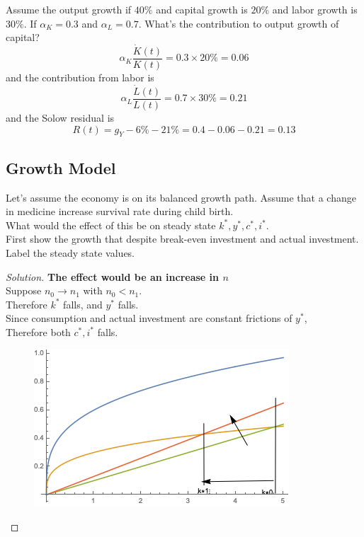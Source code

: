 \documentclass[]{article}
\begin{document}
	    \begin{example}
	    	Assume the output growth if $40\%$ and capital growth is $20\%$ and labor growth is $30\%$. If $\alpha_K = 0.3$ and $\alpha_L = 0.7$. What's the contribution to output growth of capital?
	    	\[
	    		\alpha_K \frac{\dot{K}(t)}{K(t)} = 0.3 \times 20\% = 0.06
	    	\]
	    	and the contribution from labor is
	    	\[
	    		\alpha_L \frac{\dot{L}(t)}{L(t)} = 0.7 \times 30\% = 0.21
	    	\]
	    	and the Solow residual is 
	    	\[
	    		R(t) = g_Y - 6\% - 21\% = 0.4 - 0.06 - 0.21 = 0.13
	    	\]
	    \end{example}
	    
	    \subsection{Growth Model}
	    \begin{example}
	    	Let's assume the economy is on its balanced growth path. Assume that a change in medicine increase survival rate during child birth. \\
	    	What would the effect of this be on steady state $k^*, y^*, c^*, i^*$.\\
	    	First show the growth that despite break-even investment and actual investment. Label the steady state values. \\
	    \end{example}
	    
	    \begin{proof}[Solution]
	    	\textbf{The effect would be an increase in $n$} \\
	    	Suppose $n_0 \to n_1$ with $n_0 < n_1$. \\
	    	Therefore $k^*$ falls, and $y^*$ falls. \\
	    	Since consumption and actual investment are constant frictions of $y^*$, \\
	    	Therefore both $c^*, i^*$ falls.
	    	\begin{figure}[h]
	    		\centering
	    		\includegraphics[width=0.7\linewidth]{figures/4_1}
	    	\end{figure}
	    \end{proof}
	    
\end{document}
